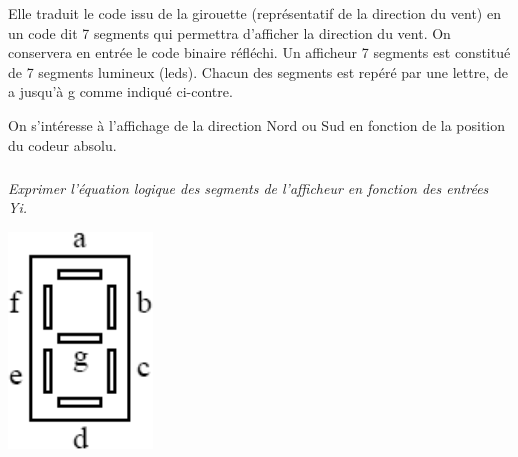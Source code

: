 \documentclass[10pt]{article}
\begin{document}
\begin{minipage}[c]{.5\linewidth}

Elle traduit le code issu de la girouette (représentatif de la direction du vent) en un code dit 7 segments qui permettra d'afficher la direction du vent. On conservera en entrée le code binaire réfléchi.
Un afficheur 7 segments est constitué de 7 segments lumineux (leds). Chacun des segments est repéré par une lettre, de a jusqu'à g comme indiqué ci-contre. 

On s’intéresse à l’affichage de la direction Nord ou Sud en fonction de la position du codeur absolu.

\subparagraph{}
\textit{Exprimer l’équation logique des segments de l’afficheur en fonction des entrées Yi.}

\end{minipage} \hfill
\begin{minipage}[c]{.15\linewidth}
\begin{center}
\includegraphics[width=.95\textwidth]{images/7segments}
\end{center}
\end{minipage} \hfill
\end{document}
